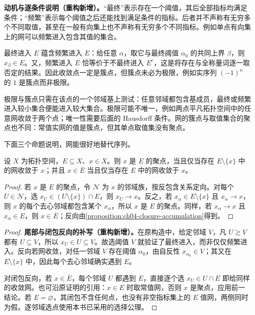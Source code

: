 \documentclass[../../main.tex]{subfiles}%
\begin{document}
\begin{remark}
\textbf{动机与逐条件说明（重构新增）。}“最终”表示存在一个阈值，其后全部指标均满足条件；“频繁”表示每个阈值之后还能找到满足条件的指标。后者并不声称有无穷多个不同取值，甚至在一般有向集上也不声称有无穷多个不同指标。例如单点有向集上的网可以频繁进入包含其值的集合。

最终进入 $E$ 蕴含频繁进入 $E$：给任意 $\alpha$，取它与最终阈值 $\alpha_0$ 的共同上界 $\beta$，则 $x_\beta\in E$。又，频繁进入 $E$ 恰等价于不最终进入 $E^c$，这是将存在与全称量词逐一取否定的结果。因此收敛点一定是簇点，但簇点未必为极限，例如实序列 $(-1)^n$ 的 $1$ 是簇点而非极限。

极限与簇点只需在该点的一个邻域基上测试：任意邻域都包含基成员，最终或频繁进入较小集合便能进入较大集合。极限可能不唯一，例如两点平凡拓扑空间中的任意网收敛于两个点；唯一性需要后面的 Hausdorff 条件。网的簇点与取值集合的聚点也不同：常值实网的值是簇点，但其单点取值集没有聚点。
\end{remark}
下面三个命题说明，网能很好地替代序列。
\begin{proposition}\label{proposition:ch04-nets-closure}
设 $X$ 为拓扑空间，$E\subseteq X$、$x\in X$。则 $x$ 是 $E$ 的聚点，当且仅当存在 $E\setminus\{x\}$ 中的网收敛于 $x$；并且 $x\in\overline E$ 当且仅当存在 $E$ 中的网收敛于 $x$。
\end{proposition}
\begin{proof}
若 $x$ 是 $E$ 的聚点，令 $\mathcal N$ 为 $x$ 的邻域族，按反包含关系定向。对每个 $U\in\mathcal N$，选 $x_U\in(U\setminus\{x\})\cap E$，则 $x_U\to x$。反之，若 $x_\alpha\in E\setminus\{x\}$ 且 $x_\alpha\to x$，则 $x$ 的每个去心邻域都包含某个 $x_\alpha$，所以 $x$ 是 $E$ 的聚点。同样，若 $x_\alpha\to x$ 且 $x_\alpha\in E$，则 $x\in\overline E$；反向由\cref{proposition:ch04-closure-accumulation}得到。
\end{proof}
\begin{proof}
\textbf{尾部与闭包反向的补写（重构新增）。}在原构造中，给定邻域 $V$，凡 $U\gtrsim V$ 都有 $U\subseteq V$，所以 $x_U\in U\subseteq V$。故选阈值 $V$ 就验证了最终进入，而非仅仅频繁进入。反向若网收敛，对任一邻域 $V$ 存在阈值 $\alpha_0$，由自反性 $x_{\alpha_0}\in V$；其又在 $E\setminus\{x\}$ 中，因此每个去心邻域确实遇到 $E$。

对闭包反向，若 $x\in\overline E$，每个邻域 $U$ 都遇到 $E$，直接逐个选 $x_U\in U\cap E$ 即给同样的收敛网。也可沿原证明的引用：$x\in E$ 时取常值网，否则 $x$ 是聚点，应用前一结论。若 $E=\varnothing$，其闭包不含任何点，也没有非空指标集上的 $E$ 值网，两侧同时为假。逐邻域选点使用本书已采用的选择公理。
\end{proof}
\end{document}
